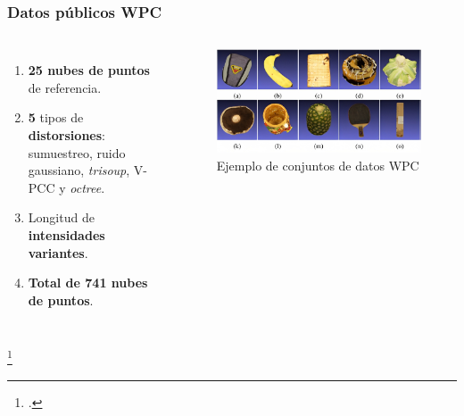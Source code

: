 \begin{frame}
    \frametitle{Datos públicos WPC}
    \begin{columns}
      \begin{enumerate}
        \item \textbf{25 nubes de puntos} de referencia.  
        \item \textbf{5} tipos de \textbf{distorsiones}: 
          sumuestreo, ruido gaussiano, \emph{trisoup}, V-PCC y \emph{octree}.
        \item Longitud de \textbf{intensidades variantes}.
        \item \textbf{Total de 741 nubes de puntos}.
      \end{enumerate}
      \begin{figure}
        \includegraphics[width=.95\textwidth]{imagenes/chapter3/WPC}
        \caption{Ejemplo de conjuntos de datos WPC\footnotemark}
        \label{fig:WPC}
      \end{figure}
    \end{columns}
    \footcitetext{WPC1}
\end{frame}

